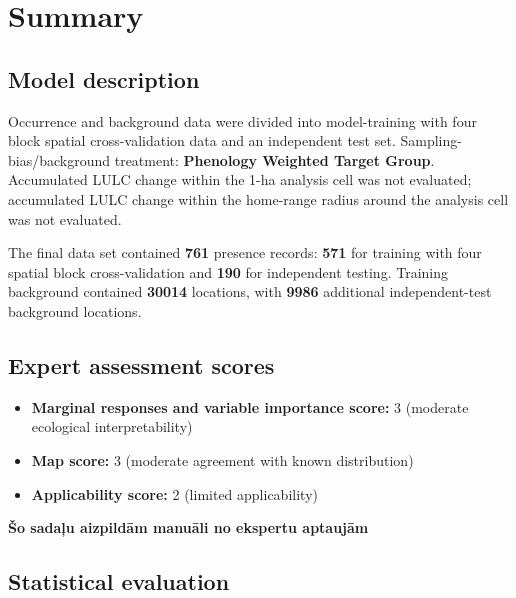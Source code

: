 \documentclass[
  openany]{book}
\providecommand{\tightlist}{%
  \setlength{\itemsep}{0pt}\setlength{\parskip}{0pt}}
\providecommand{\tightlist}{%
  \setlength{\itemsep}{0pt}%
  \setlength{\parskip}{0pt}%
}
\begin{document}
\section*{Summary}\label{summary-17}

\subsection*{Model description}\label{model-description-17}

Occurrence and background data were divided into model-training with four block spatial cross-validation data and an independent test set. Sampling-bias/background treatment: \textbf{Phenology Weighted Target Group}. Accumulated LULC change within the 1-ha analysis cell was not evaluated; accumulated LULC change within the home-range radius around the analysis cell was not evaluated.

The final data set contained \textbf{761} presence records: \textbf{571} for training with four spatial block cross-validation and \textbf{190} for independent testing. Training background contained \textbf{30014} locations, with \textbf{9986} additional independent-test background locations.

\subsection*{Expert assessment scores}\label{expert-assessment-scores-17}

\begin{itemize}
\tightlist
\item
  \textbf{Marginal responses and variable importance score:} 3 (moderate ecological interpretability)
\item
  \textbf{Map score:} 3 (moderate agreement with known distribution)
\item
  \textbf{Applicability score:} 2 (limited applicability)
\end{itemize}

\textbf{Šo sadaļu aizpildām manuāli no ekspertu aptaujām}

\subsection*{Statistical evaluation}\label{statistical-evaluation-17}
\end{document}
